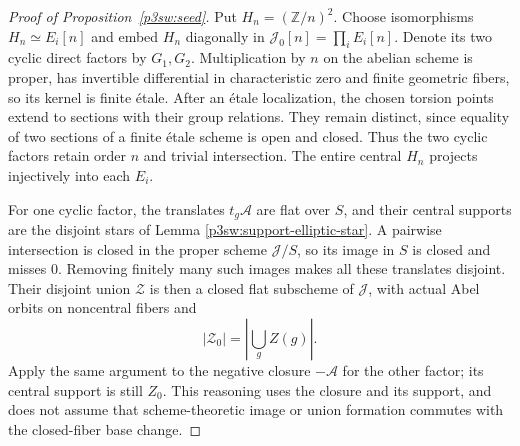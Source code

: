 \documentclass[11pt]{article}
\newcommand{\Z}{\mathbb Z}
\numberwithin{equation}{section}
\begin{document}
\begin{proof}[Proof of Proposition~\ref{p3sw:seed}]
Put \(H_n=(\Z/n)^2\).  Choose isomorphisms
\(H_n\simeq E_i[n]\) and embed \(H_n\) diagonally in
\(\mathcal J_0[n]=\prod_iE_i[n]\).  Denote its two cyclic direct
factors by \(G_1,G_2\).  Multiplication by \(n\) on the abelian scheme
is proper, has invertible differential in characteristic zero and finite
geometric fibers, so its kernel is finite \'etale.  After an \'etale
localization, the chosen torsion points extend to sections with
their group relations.  They remain distinct, since equality of
two sections of a finite \'etale scheme is open and closed.  Thus the
two cyclic factors retain order \(n\) and trivial intersection.
The entire central \(H_n\) projects injectively into each \(E_i\).

For one cyclic factor, the translates \(t_g\mathcal A\) are flat
over \(S\), and their central supports are the disjoint stars of
Lemma \ref{p3sw:support-elliptic-star}.  A pairwise intersection is
closed in the proper scheme \(\mathcal J/S\), so its image in \(S\)
is closed and misses \(0\).  Removing finitely many such images
makes all these translates disjoint.  Their disjoint union
\(\mathcal Z\) is then a closed flat subscheme of \(\mathcal J\),
with actual Abel orbits on noncentral fibers and
\begin{equation}
 |\mathcal Z_0|=\left|\bigcup_g Z(g)\right|.
 \label{p3sw:support-orbit-limit}
\end{equation}
Apply the same argument to the negative closure \(-\mathcal A\)
for the other factor; its central support is still \(Z_0\).
This reasoning uses the closure and its support, and does not assume
that scheme-theoretic image or union formation commutes with the
closed-fiber base change.


\end{proof}
\end{document}
